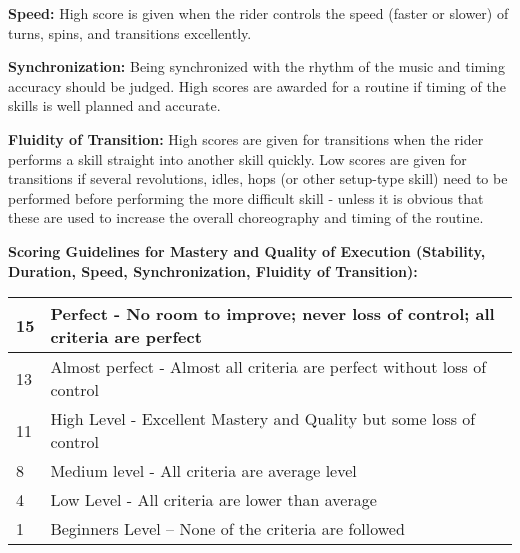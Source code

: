 \textbf{Speed:} High score is given when the rider controls the speed (faster or slower) of turns, spins, and transitions excellently.

\textbf{Synchronization:} Being synchronized with the rhythm of the music and timing accuracy should be judged.
High scores are awarded for a routine if timing of the skills is well planned and accurate.

\textbf{Fluidity of Transition:} High scores are given for transitions when the rider performs a skill straight into another skill quickly.
Low scores are given for transitions if several revolutions, idles, hops (or other setup-type skill) need to be performed before performing the more difficult skill - unless it is obvious that these are used to increase the overall choreography and timing of the routine.

\begin{minipage}{\textwidth}
\textbf{Scoring Guidelines for Mastery and Quality of Execution (Stability, Duration, Speed, Synchronization, Fluidity of Transition):} \\

\begin{tabular}{|l|p{12.5cm}|}
\hline
15 & Perfect - No room to improve; never loss of control; all criteria are perfect \\
\hline
13 & Almost perfect - Almost all criteria are perfect without loss of control \\
\hline
11 & High Level - Excellent Mastery and Quality but some loss of control \\
\hline
8 &  Medium level - All criteria are average level \\
\hline
4 & Low Level - All criteria are lower than average \\
\hline
1 & Beginners Level – None of the criteria are followed \\
\hline
\end{tabular}
\end{minipage}

